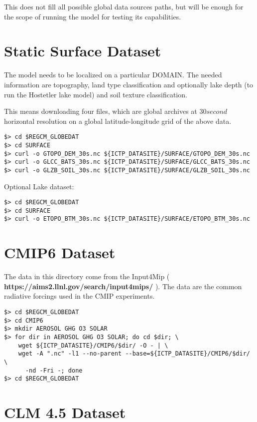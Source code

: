 This does not fill all possible global data sources paths, but will be enough
for the scope of running the model for testing its capabilities.

\section{Static Surface Dataset}

The model needs to be localized on a particular DOMAIN. The needed information
are topography, land type classification and optionally lake depth (to run the
Hostetler lake model) and soil texture classification.

This means downloading four files, which are global archives at $30 second$
horizontal resolution on a global latitude-longitude grid of the above data.

\begin{Verbatim}
$> cd $REGCM_GLOBEDAT
$> cd SURFACE
$> curl -o GTOPO_DEM_30s.nc ${ICTP_DATASITE}/SURFACE/GTOPO_DEM_30s.nc
$> curl -o GLCC_BATS_30s.nc ${ICTP_DATASITE}/SURFACE/GLCC_BATS_30s.nc
$> curl -o GLZB_SOIL_30s.nc ${ICTP_DATASITE}/SURFACE/GLZB_SOIL_30s.nc
\end{Verbatim}

Optional Lake dataset:

\begin{Verbatim}
$> cd $REGCM_GLOBEDAT
$> cd SURFACE
$> curl -o ETOPO_BTM_30s.nc ${ICTP_DATASITE}/SURFACE/ETOPO_BTM_30s.nc
\end{Verbatim}

\section{CMIP6 Dataset}

The data in this directory come from the Input4Mip (
{\bf https://aims2.llnl.gov/search/input4mips/ } ). The data are the common
radiative forcings used in the CMIP experiments.

\begin{Verbatim}
$> cd $REGCM_GLOBEDAT
$> cd CMIP6
$> mkdir AEROSOL GHG O3 SOLAR
$> for dir in AEROSOL GHG O3 SOLAR; do cd $dir; \
    wget ${ICTP_DATASITE}/CMIP6/$dir/ -O - | \
    wget -A ".nc" -l1 --no-parent --base=${ICTP_DATASITE}/CMIP6/$dir/ \
      -nd -Fri -; done
$> cd $REGCM_GLOBEDAT
\end{Verbatim}

\section{CLM 4.5 Dataset}
\label{clm45data}

